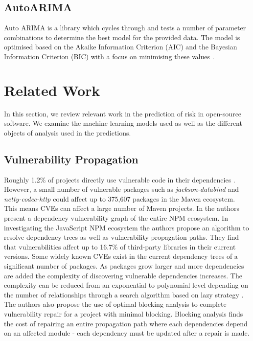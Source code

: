 \documentclass[conference]{IEEEtran}
\begin{document}
\subsection{AutoARIMA}  
Auto ARIMA is a library which cycles through and tests a number of parameter combinations to determine the best model for the provided data. The model is optimised based on the Akaike Information Criterion (AIC) and the Bayesian Information Criterion (BIC) with a focus on minimising these values \cite{noauthor_pmdarima_nodate}.

\section{Related Work}
In this section, we review relevant work in the prediction of risk in open-source software. We examine the machine learning models used as well as the different objects of analysis used in the predictions.  

\subsection{Vulnerability Propagation}
Roughly 1.2\% of projects directly use vulnerable code in their dependencies \cite{a_m_mir_effect_2023}. However, a small number of vulnerable packages such as \textit{jackson-databind} and \textit{netty-codec-http} could affect up to 375,607 packages in the Maven ecosystem. This means CVEs can affect a large number of Maven projects. In \cite{c_liu_demystifying_2022} the authors present a dependency vulnerability graph of the entire NPM ecosystem. In investigating the JavaScript NPM ecosystem the authors propose an algorithm to resolve dependency trees as well as vulnerability propagation paths. They find that vulnerabilities affect up to 16.7\% of third-party libraries in their current versions. Some widely known CVEs exist in the current dependency trees of a significant number of packages. As packages grow larger and more dependencies are added the complexity of discovering vulnerable dependencies increases. The complexity can be reduced from an exponential to polynomial level depending on the number of relationships through a search algorithm based on lazy strategy \cite{w_hu_open_2019}. The authors also propose the use of optimal blocking analysis to complete vulnerability repair for a project with minimal blocking. Blocking analysis finds the cost of repairing an entire propagation path where each dependencies depend on an affected module - each dependency must be updated after a repair is made. 
\end{document}
